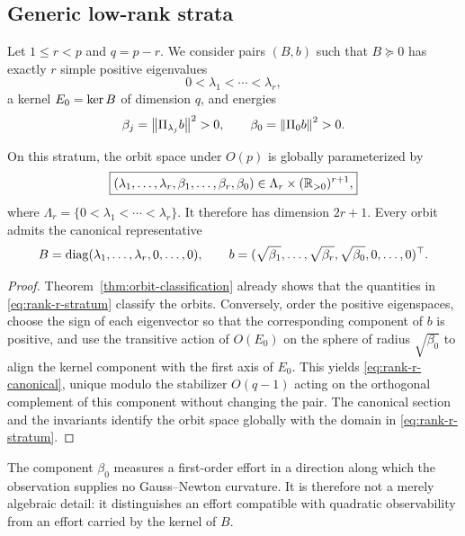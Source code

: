 \subsection{Generic low-rank strata}
Let $1\leq r<p$ and $q=p-r$. We consider pairs $(B,b)$ such that $B\succeq0$ has exactly $r$ simple positive eigenvalues
\[
0<\lambda_1<\cdots<\lambda_r,
\]
a kernel $E_0=\operatorname{ker} B$ of dimension $q$, and energies
\[
\beta_j=\left\lVert \Pi_{\lambda_j}b\right\rVert^2>0,
\qquad
\beta_0=\left\lVert \Pi_0b\right\rVert^2>0.
\]

\begin{proposition}
On this stratum, the orbit space under $O(p)$ is globally parameterized by
\begin{equation}
\boxed{
(\lambda_1,\ldots,\lambda_r,
 \beta_1,\ldots,\beta_r,\beta_0)
\in
\Lambda_r\times(\mathbb{R}_{>0})^{r+1},
}
\label{eq:rank-r-stratum}
\end{equation}
where $\Lambda_r=\{0<\lambda_1<\cdots<\lambda_r\}$. It therefore has dimension $2r+1$. Every orbit admits the canonical representative
\begin{equation}
B=\operatorname{diag}(\lambda_1,\ldots,\lambda_r,0,\ldots,0),
\qquad
b=(\sqrt{\beta_1},\ldots,\sqrt{\beta_r},\sqrt{\beta_0},0,\ldots,0)^\top.
\label{eq:rank-r-canonical}
\end{equation}
\label{prop:rank-r-stratum}
\end{proposition}

\begin{proof}
Theorem~\ref{thm:orbit-classification} already shows that the quantities in \eqref{eq:rank-r-stratum} classify the orbits. Conversely, order the positive eigenspaces, choose the sign of each eigenvector so that the corresponding component of $b$ is positive, and use the transitive action of $O(E_0)$ on the sphere of radius $\sqrt{\beta_0}$ to align the kernel component with the first axis of $E_0$. This yields \eqref{eq:rank-r-canonical}, unique modulo the stabilizer $O(q-1)$ acting on the orthogonal complement of this component without changing the pair. The canonical section and the invariants identify the orbit space globally with the domain in \eqref{eq:rank-r-stratum}.
\end{proof}

The component $\beta_0$ measures a first-order effort in a direction along which the observation supplies no Gauss--Newton curvature. It is therefore not a merely algebraic detail: it distinguishes an effort compatible with quadratic observability from an effort carried by the kernel of $B$.

